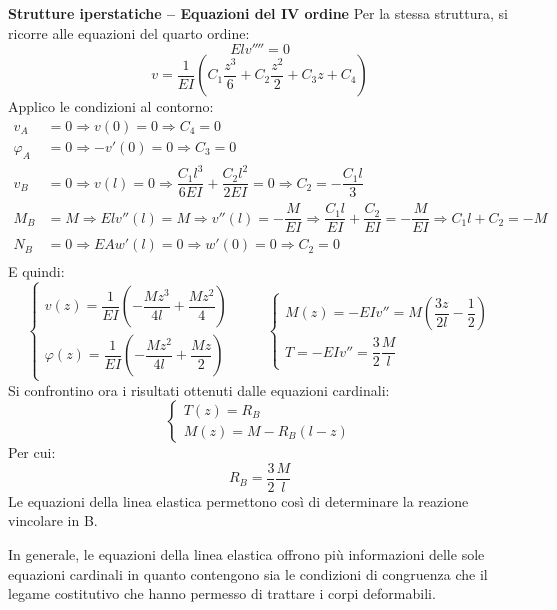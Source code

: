 \documentclass{article}
\begin{document}
\begin{adjustwidth}{2in}{}
{\Large \textbf{Strutture iperstatiche – Equazioni del IV ordine}} \mbox{} \newline
		Per la stessa struttura, si ricorre alle equazioni del quarto ordine:
		\[Elv'''' = 0\]
		\[v = \dfrac{1}{EI}\left( C_1\dfrac{z^3}{6} + C_2\dfrac{z^2}{2} + C_3z + C_4 \right) \]
		Applico le condizioni al contorno: 
		\[ \begin{split}
			v_A & = 0 \Rightarrow v(0) = 0 \Rightarrow C_4 = 0 \\
			\varphi_A & = 0 \Rightarrow -v'(0) = 0 \Rightarrow C_3 = 0 \\
			v_B & = 0 \Rightarrow v(l) = 0 \Rightarrow \dfrac{C_1l^3}{6EI} + \dfrac{C_2l^2}{2EI} = 0 \Rightarrow C_2 = -\dfrac{C_1l}{3} \\
			M_B & = M \Rightarrow Elv''(l) = M \Rightarrow v''(l) = -\dfrac{M}{EI} \Rightarrow \dfrac{C_1l}{EI} + \dfrac{C_2}{EI} = -\dfrac{M}{EI} \Rightarrow C_1l + C_2 = -M \\
			N_B & = 0 \Rightarrow EAw'(l) = 0 \Rightarrow w'(0) = 0 \Rightarrow C_2 = 0 \\					
		\end{split}
		\]
		E quindi:
		\[
		\begin{cases}
			v(z) =  \dfrac{1}{EI}\left( -\dfrac{Mz^3}{4l}  + \dfrac{Mz^2}{4} \right)  \\
			\varphi(z) = \dfrac{1}{EI}\left( -\dfrac{Mz^2}{4l}  + \dfrac{Mz}{2} \right)
		\end{cases} \hspace{1cm} \begin{cases}
			M(z) = -EIv'' = M\left( \dfrac{3z}{2l} - \dfrac{1}{2}\right)  \\
			T = -EIv'' = \dfrac{3}{2}\dfrac{M}{l}
		\end{cases}
		\]
		Si confrontino ora i risultati ottenuti dalle equazioni cardinali:
		\[
			\begin{cases}
				T(z) = R_B \\
				M(z) = M - R_B(l-z)
			\end{cases}
		\]
		Per cui: 
		\[ R_B = \dfrac{3}{2}\dfrac{M}{l} \]
		Le equazioni della linea elastica permettono così di determinare la reazione vincolare in B.
		
		In generale, le equazioni della linea elastica offrono più informazioni delle sole equazioni cardinali in
		quanto contengono sia le condizioni di congruenza che il legame costitutivo che hanno permesso di trattare
		i corpi deformabili. \newline 
		

\end{adjustwidth}
\end{document}
